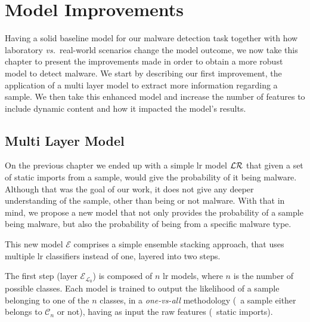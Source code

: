 
\chapter{Model Improvements}
\label{chapter:model_improvements}

Having a solid baseline model for our malware detection task together with how laboratory \textit{vs.}\ real-world scenarios change the model outcome, we now take this chapter to present the improvements made in order to obtain a more robust model to detect malware.
We start by describing our first improvement, the application of a multi layer model to extract more information regarding a sample.
We then take this enhanced model and increase the number of features to include dynamic content and how it impacted the model's results.

\section{Multi Layer Model}
\label{section:improvements_multi_layer}

On the previous chapter we ended up with a simple \gls{lr} model $\mathcal{LR}$ that given a set of static imports from a sample, would give the probability of it being malware.
Although that was the goal of our work, it does not give any deeper understanding of the sample, other than being or not malware.
With that in mind, we propose a new model that not only provides the probability of a sample being malware, but also the probability of being from a specific malware type.

This new model $\mathcal{E}$ comprises a simple ensemble stacking approach, that uses multiple \gls{lr} classifiers instead of one, layered into two steps.

The first step (layer $\mathcal{E}_{\mathcal{L}_{0}}$) is composed of $n$ \gls{lr} models, where $n$ is the number of possible classes.
Each model is trained to output the likelihood of a sample belonging to one of the $n$ classes, in a \textit{one-vs-all} methodology (\ie\ a sample either belongs to $\mathcal{C}_{n}$ or not), having as input the raw features (\eg\ static imports).

